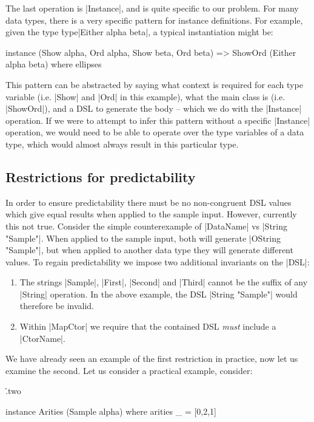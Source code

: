 \documentclass[preprint,draft]{sigplanconf}
\begin{document}
The last operation is |Instance|, and is quite specific to our problem. For many data types, there is a very specific pattern for instance definitions. For example, given the type \h{type}|Either alpha beta|, a typical instantiation might be:

\ignore\begin{code}
instance (Show alpha, Ord alpha, Show beta, Ord beta) =>
    ShowOrd (Either alpha beta) where ellipses
\end{code}

This pattern can be abstracted by saying what context is required for each type variable (i.e. |Show| and |Ord| in this example), what the main class is (i.e. |ShowOrd|), and a DSL to generate the body -- which we do with the |Instance| operation. If we were to attempt to infer this pattern without a specific |Instance| operation, we would need to be able to operate over the type variables of a data type, which would almost always result in this particular type.

\subsection{Restrictions for predictability}
\label{sec:predictability}

In order to ensure predictability there must be no non-congruent DSL values which give equal results when applied to the sample input. However, currently this not true. Consider the simple counterexample of |DataName| vs |String "Sample"|. When applied to the sample input, both will generate |OString "Sample"|, but when applied to another data  type they will generate different values. To regain predictability we impose two additional invariants on the |DSL|:

\begin{enumerate}
\item The strings |Sample|, |First|, |Second| and |Third| cannot be the suffix of any |String| operation. In the above example, the DSL |String "Sample"| would therefore be invalid.
\item Within |MapCtor| we require that the contained DSL \textit{must} include a |CtorName|.
\end{enumerate}

We have already seen an example of the first restriction in practice, now let us examine the second. Let us consider a practical example, consider:

\h{.two}\begin{code}
instance Arities (Sample alpha) where
    arities _ = [0,2,1]
\end{code}
\end{document}
